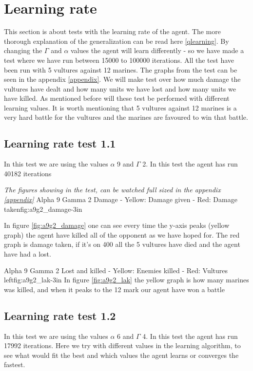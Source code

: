 \section{Learning rate}
This section is about tests with the learning rate of the agent. The more thorough explanation of the generalization can be read here \ref{qlearning}.
By changing the $\Gamma$ and $\alpha$ values the agent will learn differently - so we have made a test where we have run between 15000 to 100000 iterations. All the test have been run with 5 vultures against 12 marines. The graphs from the test can be seen in the appendix \ref{appendix}. We will make test over how much damage the vultures have dealt and how many units we have lost and how many units we have killed. As mentioned before will these test be performed with different learning values. It is worth mentioning that 5 vultures against 12 marines is a very hard battle for the vultures and the marines are favoured to win that battle.

\subsection*{Learning rate test 1.1}
In this test we are using the values $\alpha$ 9 and $\Gamma$ 2. In this test the agent has run 40182 iterations


\textit{The figures showing in the test, can be watched full sized in the appendix \ref{appendix}} 
			{Alpha 9 Gamma 2 Damage - Yellow: Damage given - Red: Damage taken}{fig:a9g2_damage}{-3in}

In figure \ref{fig:a9g2_damage} one can see every time the y-axis peaks (yellow graph) the agent have killed all of the opponent as we have hoped for. The red graph is damage taken, if it's on 400 all the 5 vultures have died and the agent have had a lost.


			{Alpha 9 Gamma 2 Lost and killed - Yellow: Enemies killed - Red: Vultures left}{fig:a9g2_lak}{-3in}
In figure \ref{fig:a9g2_lak} the yellow graph is how many marines was killed, and when it peaks to the 12 mark our agent have won a battle


\subsection*{Learning rate test 1.2}
In this test we are using the values $\alpha$ 6 and $\Gamma$ 4. In this test the agent has run 17992 iterations. Here we try with different values in the learning algorithm, to see what would fit the best and which values the agent learns or converges the fastest.


